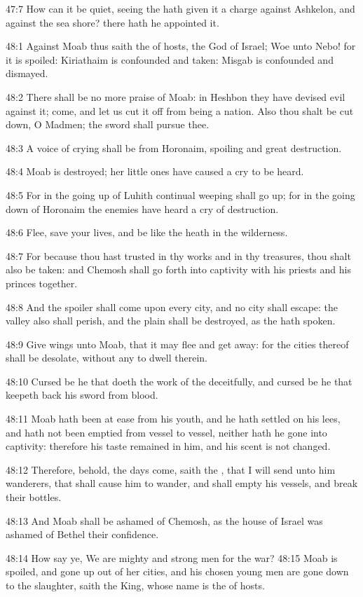 47:7 How can it be quiet, seeing the \LORD hath given it a charge against Ashkelon, and against the sea shore? there hath he appointed it.

48:1 Against Moab thus saith the \LORD of hosts, the God of Israel; Woe unto Nebo! for it is spoiled: Kiriathaim is confounded and taken: Misgab is confounded and dismayed.

48:2 There shall be no more praise of Moab: in Heshbon they have devised evil against it; come, and let us cut it off from being a nation. Also thou shalt be cut down, O Madmen; the sword shall pursue thee.

48:3 A voice of crying shall be from Horonaim, spoiling and great destruction.

48:4 Moab is destroyed; her little ones have caused a cry to be heard.

48:5 For in the going up of Luhith continual weeping shall go up; for in the going down of Horonaim the enemies have heard a cry of destruction.

48:6 Flee, save your lives, and be like the heath in the wilderness.

48:7 For because thou hast trusted in thy works and in thy treasures, thou shalt also be taken: and Chemosh shall go forth into captivity with his priests and his princes together.

48:8 And the spoiler shall come upon every city, and no city shall escape: the valley also shall perish, and the plain shall be destroyed, as the \LORD hath spoken.

48:9 Give wings unto Moab, that it may flee and get away: for the cities thereof shall be desolate, without any to dwell therein.

48:10 Cursed be he that doeth the work of the \LORD deceitfully, and cursed be he that keepeth back his sword from blood.

48:11 Moab hath been at ease from his youth, and he hath settled on his lees, and hath not been emptied from vessel to vessel, neither hath he gone into captivity: therefore his taste remained in him, and his scent is not changed.

48:12 Therefore, behold, the days come, saith the \LORD, that I will send unto him wanderers, that shall cause him to wander, and shall empty his vessels, and break their bottles.

48:13 And Moab shall be ashamed of Chemosh, as the house of Israel was ashamed of Bethel their confidence.

48:14 How say ye, We are mighty and strong men for the war?  48:15 Moab is spoiled, and gone up out of her cities, and his chosen young men are gone down to the slaughter, saith the King, whose name is the \LORD of hosts.

